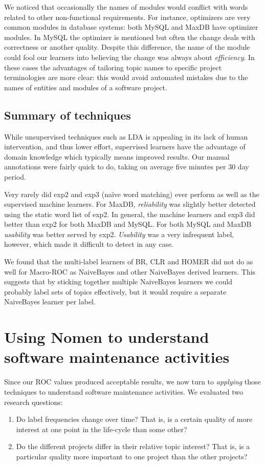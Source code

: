 \documentclass[]{sig-alternate}
\begin{document}
We noticed that occasionally the names of modules would conflict with words related to other non-functional requirements. For instance, optimizers are very common modules in database systems: both MySQL and MaxDB have optimizer modules. In MySQL the optimizer is mentioned but often the change deals with correctness or another quality. Despite this difference, the name of the module could fool our learners into believing the change was always about \emph{efficiency}. In these cases the advantages of tailoring topic names to specific project terminologies are more clear: this would avoid automated mistakes due to the names of entities and modules of a software project.

\subsection{Summary of techniques}
While unsupervised techniques such as LDA is appealing in its lack of human intervention, and thus lower effort, supervised learners have the advantage of domain knowledge which typically means improved results. Our manual annotations were fairly quick to do, taking on average five minutes per 30 day period. 

Very rarely did \textsf{exp2} and \textsf{exp3} (naïve word matching) ever perform as well as the supervised machine learners. For MaxDB, \textit{reliability} was slightly better detected using the static word list of \textsf{exp2}. 
In general, the machine learners and \textsf{exp3} did better than \textsf{exp2} for both MaxDB and MySQL. 
For both MySQL and MaxDB \textit{usability} was better served by \textsf{exp2}. 
\textit{Usability} was a very infrequent label, however, which made it difficult to detect in any case.

We found that the multi-label learners of BR, CLR and HOMER did not do as well for Macro-ROC as NaiveBayes and other NaiveBayes derived learners. 
This suggests that by sticking together multiple NaiveBayes learners we could probably label sets of topics effectively, but it would require a separate NaiveBayes learner per label.


\section{Using \textbf{Nomen} to understand software maintenance activities} 
\label{sec:analysis}
Since our ROC values produced acceptable results, we now turn to \emph{applying} those techniques to understand software maintenance activities. We evaluated two research questions:
\begin{enumerate}
\item Do label frequencies change over time? That is, is a certain quality of more interest at one point in the life-cycle than some other? 
\item  Do the different projects differ in their relative topic interest? That is, is a particular quality more important to one project than the other projects?  
\end{enumerate}
\end{document}
